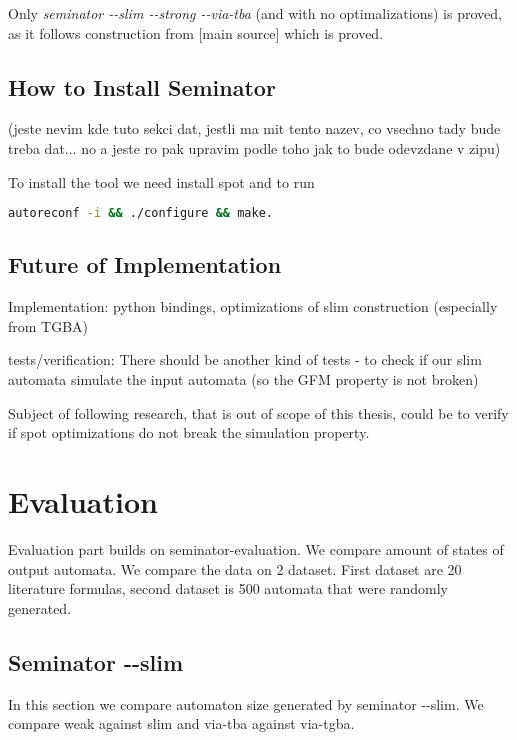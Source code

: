 \documentclass[
	digital
nolof, nolot
]{fithesis3}
\begin{document}
	Only \emph{seminator -{}-slim -{}-strong -{}-via-tba} (and with no optimalizations) is proved, as it follows construction from [main source] which is proved.
	
	
	\section{How to Install Seminator}
	(jeste nevim kde tuto sekci dat, jestli ma mit tento nazev, co vsechno tady bude treba dat... no a jeste ro pak upravim podle toho jak to bude odevzdane v zipu)
	
	To install the tool we need install spot and to run 
	
	\begin{lstlisting}[language=bash]
autoreconf -i && ./configure && make.
	\end{lstlisting}
	\section{Future of Implementation}
	Implementation:
	python bindings, optimizations of slim construction (especially from TGBA)
	
	
	
	tests/verification:
	There should be another kind of tests - to check if our slim automata simulate the input automata (so the GFM property is not broken)
	
	Subject of following research, that is out of scope of this thesis, could be to verify if spot optimizations do not break the simulation property. 
	
	\chapter{Evaluation}
	Evaluation part builds on seminator-evaluation. We compare amount of states of output automata. We compare the data on 2 dataset. First dataset are 20 literature formulas, second dataset is 500 automata that were randomly generated.
	
	
	\section{Seminator -\/-slim}
	In this section we compare automaton size generated by seminator -{}-slim.
	We compare weak against slim and via-tba against via-tgba.
\end{document}
